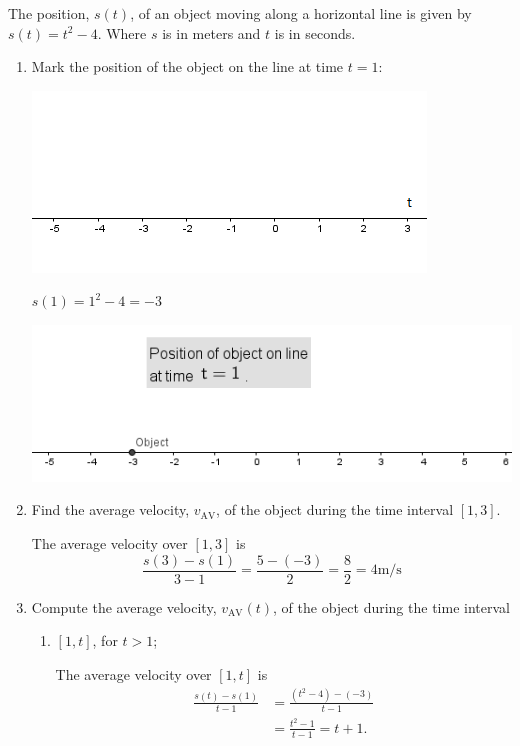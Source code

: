 \documentclass[nooutcomes, handout]{ximera}
\begin{document}
	
\begin{problem} 
The position, $s(t)$, of an object moving along a horizontal line is given by $s(t) = t^2 - 4$.  Where $s$ is in meters and $t$ is in seconds.
\begin{enumerate}
\item
Mark the position of the object on the line at time $t = 1$:
\begin{image}
\includegraphics[scale = 1]{Figure9.png}
\end{image} 

\begin{freeResponse}
$s(1)=1^2-4=-3$
\begin{image}
\includegraphics[scale = .8]{Figure8.png}
\end{image}
\end{freeResponse}


\item
Find the average velocity, $v_{\mathrm{AV}}$, of the object during the time interval $[1, 3]$.
\begin{freeResponse}
The average velocity over $[1, 3]$ is
\[
\frac{s(3) - s(1)}{3-1} = \frac{5 - (-3)}{2} = \frac{8}{2} = 4 \text{m/s}
\]
\end{freeResponse}


\item
Compute the average velocity, $v_{\mathrm{AV}}(t)$, of the object during the time interval
\begin{enumerate}
\item
$[1, t]$, for $t > 1$;
\begin{freeResponse}
The average velocity over $[1, t]$ is
\begin{align*}
\frac{s(t) - s(1)}{t-1} &= \frac{(t^2-4) - (-3)}{t-1}\\
&= \frac{t^2-1}{t-1} = t+1.
\end{align*}
\end{freeResponse}


\end{enumerate}
\end{enumerate}
\end{problem}
\end{document}
